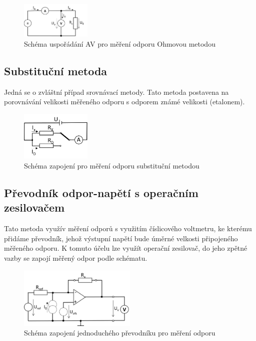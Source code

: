 \documentclass[a4paper, czech]{article}
\begin{document}
\begin{figure}[H]
    \centering
    \includegraphics[width=0.3\textwidth]{schema2.png}
    \caption{Schéma uspořádání AV pro měření odporu Ohmovou metodou}
\end{figure}

\subsection{Substituční metoda}

Jedná se o zvláštní případ srovnávací metody.
Tato metoda postavena na porovnávání velikosti měřeného odporu s odporem známé velikosti (etalonem).

\begin{figure}[H]
    \centering
    \includegraphics[width=0.3\textwidth]{schema3.png}
    \caption{Schéma zapojení pro měření odporu substituční metodou}
\end{figure}

\subsection{Převodník odpor-napětí s operačním zesilovačem}

Tato metoda využív měření odporů s využitím číslicového voltmetru, ke kterému přidáme převodník, jehož výstupní napětí bude úměrné velkosti připojeného měřeného odporu.
K tomuto účelu lze využít operační zesilovač, do jeho zpětné vazby se zapojí měřený odpor podle schématu.

\begin{figure}[H]
    \centering
    \includegraphics[width=0.5\textwidth]{schema4.png}
    \caption{Schéma zapojení jednoduchého převodníku pro měření odporu}
\end{figure}
\end{document}
